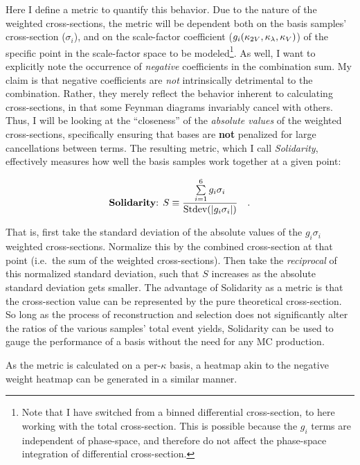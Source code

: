     Here I define a metric to quantify this behavior.
    Due to the nature of the weighted cross-sections,
        the metric will be dependent both on the basis samples' cross-section ($\sigma_i$),
        and on the scale-factor coefficient ($g_i(\kappa_{2V},\kappa_{\lambda},\kappa_{V})$) of the specific point in the scale-factor space to be modeled\footnote{
            Note that I have switched from a binned differential cross-section, to here working with the total cross-section.
            This is possible because the $g_i$ terms are independent of phase-space,
                and therefore do not affect the phase-space integration of differential cross-section.
        }.
    As well, I want to explicitly note the occurrence of \textit{negative} coefficients in the combination sum.
    My claim is that negative coefficients are \textit{not} intrinsically detrimental to the combination.
    Rather, they merely reflect the behavior inherent to calculating cross-sections,
        in that some Feynman diagrams invariably cancel with others.
    Thus, I will be looking at the ``closeness'' of the \textit{absolute values} of the weighted cross-sections,
        specifically ensuring that bases are \textbf{not} penalized for large cancellations between terms.
    The resulting metric, which I call \textit{Solidarity}, effectively measures how well the basis samples work together at a given point:

    \begin{equation}
        \textrm{\textbf{Solidarity}: }S \equiv \frac{ \sum\limits_{i=1}^6 g_i\sigma_i }{ \textrm{Stdev}(|g_i\sigma_i|) }
        \quad.
    \end{equation}

    That is, first take the standard deviation of the absolute values of the $ g_i \sigma_i $ weighted cross-sections.
    Normalize this by the combined cross-section at that point (i.e.\ the sum of the weighted cross-sections).
    Then take the \textit{reciprocal} of this normalized standard deviation,
        such that $S$ increases as the absolute standard deviation gets smaller.
    The advantage of Solidarity as a metric
        is that the cross-section value can be represented by the pure theoretical cross-section.
    So long as the process of reconstruction and selection does not significantly alter the ratios of the various samples' total event yields,
        Solidarity can be used to gauge the performance of a basis without the need for any MC production.

    As the metric is calculated on a per-$\kappa$ basis,
        a heatmap akin to the negative weight heatmap can be generated in a similar manner.

